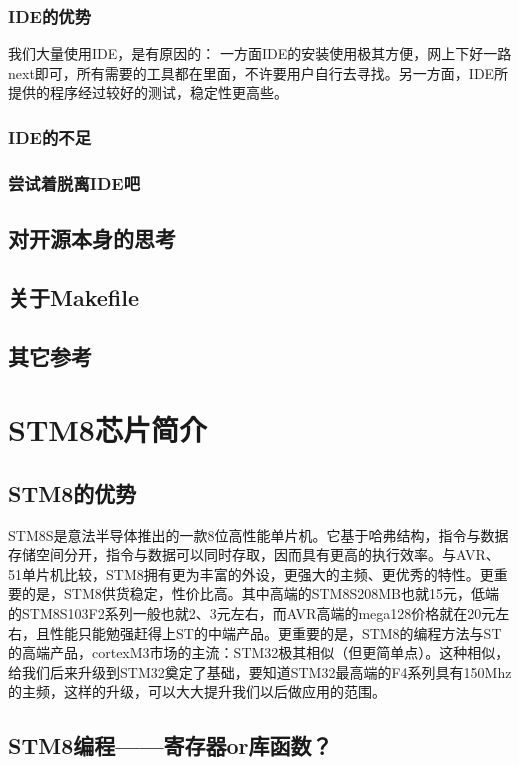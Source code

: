 \documentclass[a4paper]{book}
\newcommand{\chap}[1]{\newpage\thispagestyle{empty}\chapter{#1}\label{chap:\thechapter}}
\begin{document}
\subsection{IDE的优势}

我们大量使用IDE，是有原因的： 一方面IDE的安装使用极其方便，网上下好一路next即可，所有需要的工具都在里面，不许要用户自行去寻找。另一方面，IDE所提供的程序经过较好的测试，稳定性更高些。

\subsection{IDE的不足}

\subsection{尝试着脱离IDE吧}

\section{对开源本身的思考}

\section{关于Makefile}

\section{其它参考}

\chap{STM8芯片简介}

\section{STM8的优势}

STM8S是意法半导体推出的一款8位高性能单片机。它基于哈弗结构，指令与数据存储空间分开，指令与数据可以同时存取，因而具有更高的执行效率。与AVR、51单片机比较，STM8拥有更为丰富的外设，更强大的主频、更优秀的特性。更重要的是，STM8供货稳定，性价比高。其中高端的STM8S208MB也就15元，低端的STM8S103F2系列一般也就2、3元左右，而AVR高端的mega128价格就在20元左右，且性能只能勉强赶得上ST的中端产品。更重要的是，STM8的编程方法与ST的高端产品，cortexM3市场的主流：STM32极其相似（但更简单点）。这种相似，给我们后来升级到STM32奠定了基础，要知道STM32最高端的F4系列具有150Mhz的主频，这样的升级，可以大大提升我们以后做应用的范围。

\section{STM8编程------寄存器or库函数？}
\end{document}
